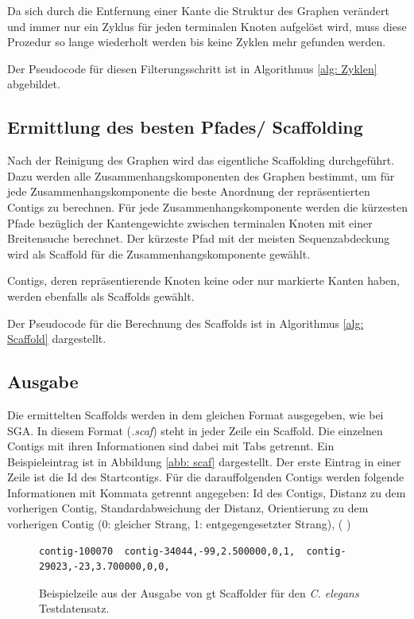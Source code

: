 \documentclass[a4paper,10pt,parskip]{scrartcl}
\begin{document}
Da sich durch die Entfernung einer Kante die Struktur des Graphen
verändert und immer nur ein Zyklus für jeden terminalen Knoten
aufgelöst wird, muss diese Prozedur so lange wiederholt werden bis
keine Zyklen mehr gefunden werden.

Der Pseudocode für diesen Filterungsschritt ist in Algorithmus
\ref{alg: Zyklen} abgebildet.

\subsection{Ermittlung des besten Pfades/ Scaffolding}

Nach der Reinigung des Graphen wird das eigentliche Scaffolding
durchgeführt. Dazu werden alle Zusammenhangskomponenten des Graphen
bestimmt, um für jede Zusammenhangskomponente die beste Anordnung der
repräsentierten Contigs zu berechnen. Für jede Zusammenhangskomponente
werden die kürzesten Pfade bezüglich der Kantengewichte zwischen
terminalen Knoten mit einer Breitensuche berechnet. Der kürzeste Pfad
mit der meisten Sequenzabdeckung wird als Scaffold für die
Zusammenhangskomponente gewählt.

Contigs, deren repräsentierende Knoten keine oder nur markierte Kanten
haben, werden ebenfalls als Scaffolds gewählt.

Der Pseudocode für die Berechnung des Scaffolds ist in Algorithmus
\ref{alg: Scaffold} dargestellt.

\subsection{Ausgabe}
Die ermittelten Scaffolds werden in dem gleichen Format ausgegeben,
wie bei SGA. In diesem Format (\textit{.scaf}) steht in jeder Zeile
ein Scaffold. Die einzelnen Contigs mit ihren Informationen sind dabei
mit Tabs getrennt. Ein Beispieleintrag ist in Abbildung \ref{abb:
  scaf} dargestellt. Der erste Eintrag in einer Zeile ist die Id des
Startcontigs. Für die darauffolgenden Contigs werden folgende
Informationen mit Kommata getrennt angegeben: Id des Contigs, Distanz
zu dem vorherigen Contig, Standardabweichung der Distanz, Orientierung
zu dem vorherigen Contig (0: gleicher Strang, 1: entgegengesetzter
Strang), ( )

\begin{figure}
\begin{verbatim}
contig-100070  contig-34044,-99,2.500000,0,1,  contig-29023,-23,3.700000,0,0,
\end{verbatim}
\caption{\label{abb: scaf}Beispielzeile aus der Ausgabe von gt
  Scaffolder für den \textit{C. elegans} Testdatensatz.}
\end{figure}
\end{document}
